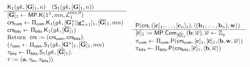 \begin{figure}
\begin{\algSize}
$$
\begin{array}{ll}
\begin{array}{l}
\algK_1(\gk,[\matr{G}]_1,n)\quad (\mathsf{S}_1(\gk,[\matr{G}]_1,n))\\
\hline
{[\overline{\matr{G}}]_1 \gets \MP.\algK(1^\lambda,mn,\distlin_1^{mn,0})}\\
\crs_\sfcom\gets\Pi_\sfcom.\algK_1(\gk,[\vecb{G}^n_1||\vecb{g}_{n+1}^n]_1,[\ovG]_1, mn)\\
\crs_\sfbits\gets\Pi_\sfbits.\algK_1(\gk,[\overline{\matr{G}}]_1)\\
\text{Return } \ \mathsf{crs}:=(\crs_\sfcom,\crs_\sfbits).\\
(\tau_\sfcom\gets\Pi_\sfcom.\mathsf{S}_1(\gk,[\matr{G}^n]_1,[\ovG]_1,mn)\\
\tau_\sfbits\gets\Pi_\sfbits.\mathsf{S}_1(\gk,[\overline{\matr{G}}]_1).\\
\tau := (\vecb{a},\tau_\sflin,\tau_\sfbits)).\\
\\
\end{array}
&
\begin{array}{l}
{\algP(\mathsf{crs}, ([\vecb{c}]_1,\ldots,[\vecb{c}_n]_1), \langle (\vecb{b}_1,\ldots,\vecb{b}_n), \vecb{w}\rangle)}\\
\hline
{[\ovecb{c}]_1 :=\MP.\Com_{[\ovG]_1}(\vecb{b};\overline{w})},\overline{w}\gets\Z_q\\
{\pi_\sfcom \gets \Pi_{\sfcom}.\algP(\crs_\sfcom,[\vecb{c}]_1,[\ovecb{c}]_1,}{\langle\vecb{b},\vecb{w},\overline{w}\rangle)}\\
\pi_\sfbits \gets \Pi_\sfbits.\algP(\crs_\sfbits,[\ovc]_1,\langle \vecb{b},\overline{w}\rangle)\\

\end{array}
\end{array}$$
\end{\algSize}
\end{figure}
